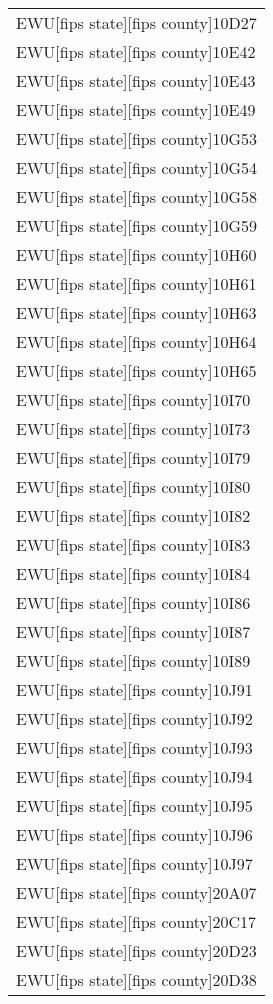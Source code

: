 \begin{supertabular}{l}
EWU[fips state][fips county]10D27\\
EWU[fips state][fips county]10E42\\
EWU[fips state][fips county]10E43\\
EWU[fips state][fips county]10E49\\
EWU[fips state][fips county]10G53\\
EWU[fips state][fips county]10G54\\
EWU[fips state][fips county]10G58\\
EWU[fips state][fips county]10G59\\
EWU[fips state][fips county]10H60\\
EWU[fips state][fips county]10H61\\
EWU[fips state][fips county]10H63\\
EWU[fips state][fips county]10H64\\
EWU[fips state][fips county]10H65\\
EWU[fips state][fips county]10I70\\
EWU[fips state][fips county]10I73\\
EWU[fips state][fips county]10I79\\
EWU[fips state][fips county]10I80\\
EWU[fips state][fips county]10I82\\
EWU[fips state][fips county]10I83\\
EWU[fips state][fips county]10I84\\
EWU[fips state][fips county]10I86\\
EWU[fips state][fips county]10I87\\
EWU[fips state][fips county]10I89\\
EWU[fips state][fips county]10J91\\
EWU[fips state][fips county]10J92\\
EWU[fips state][fips county]10J93\\
EWU[fips state][fips county]10J94\\
EWU[fips state][fips county]10J95\\
EWU[fips state][fips county]10J96\\
EWU[fips state][fips county]10J97\\
EWU[fips state][fips county]20A07\\
EWU[fips state][fips county]20C17\\
EWU[fips state][fips county]20D23\\
EWU[fips state][fips county]20D38\\

\end{supertabular}

